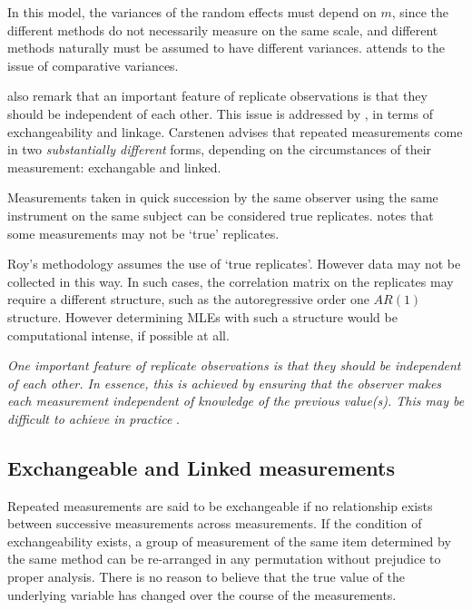 \documentclass[12pt, a4paper]{report}
\theoremstyle{plain}
\theoremstyle{definition}
\theoremstyle{remark}
\begin{document}
	
	
	
	In this model, the variances of the random effects must depend on
	$m$, since the different methods do not necessarily measure on the 	same scale, and different methods naturally must be assumed to have different variances. \citet{BXC2004} attends to the issue of comparative variances.
	
	
	\citet{BA99} also remark that an important feature of replicate observations is that they should be independent
	of each other. This issue is addressed by \citet{BXC2010}, in terms of exchangeability and linkage. Carstenen advises that repeated measurements come in two \emph{substantially different} forms, depending on the circumstances of their measurement: exchangable and linked.
	
	
	Measurements taken in quick succession by the same observer using the same instrument on the same subject can be considered true replicates. \citet{ARoy2009} notes that some measurements may not be `true' replicates.
	
	Roy's methodology assumes the use of `true replicates'. However data may not be collected in this way. In such cases, the correlation matrix on the replicates may require a different structure, such as the autoregressive order one $AR(1)$ structure. However determining MLEs with such a structure would be computational intense, if possible at all.
	
	\emph{
		One important feature of replicate observations is that they should be independent
		of each other. In essence, this is achieved by ensuring that the observer makes each
		measurement independent of knowledge of the previous value(s). This may be difficult
		to achieve in practice} \citep{BA99}.

	\subsection{Exchangeable and Linked measurements}
	
	
	Repeated measurements are said to be exchangeable if no relationship exists between successive measurements across measurements. If the condition of exchangeability exists, a group of measurement of the same item determined by the same method can be re-arranged in any permutation without prejudice to proper analysis. There is no reason to believe that the true value of the underlying variable has changed over the course of the measurements.
	
\end{document}
